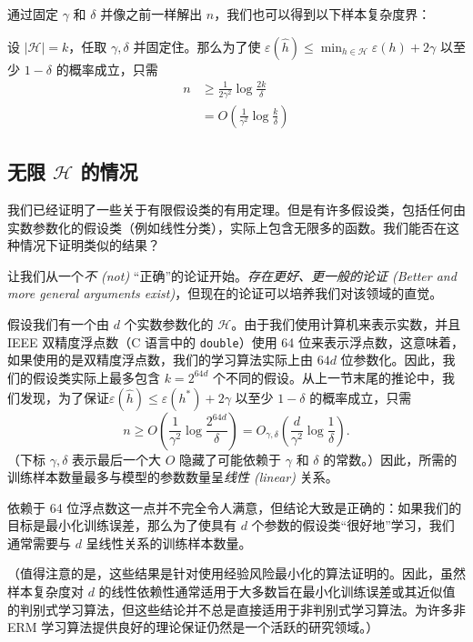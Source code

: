 通过固定 $\gamma$ 和 $\delta$ 并像之前一样解出 $n$，我们也可以得到以下样本复杂度界：

\begin{corollary*}
    设 $|\mathcal{H}| = k$，任取 $\gamma, \delta$ 并固定住。那么为了使 $\varepsilon(\hat{h}) \leq \min_{h \in \mathcal{H}} \varepsilon(h) + 2\gamma$ 以至少 $1 - \delta$ 的概率成立，只需
    \begin{align*}
        n 
        &\geq \frac{1}{2\gamma^2} \log \frac{2k}{\delta}\\
        & = O\left(\frac{1}{\gamma^2} \log \frac{k}{\delta}\right)
    \end{align*}
\end{corollary*}

\subsection{无限 \texorpdfstring{$\mathcal{H}$}{H} 的情况}


我们已经证明了一些关于有限假设类的有用定理。但是有许多假设类，包括任何由实数参数化的假设类（例如线性分类），实际上包含无限多的函数。我们能否在这种情况下证明类似的结果？

让我们从一个\textit{不 (not)} “正确”的论证开始。\textit{存在更好、更一般的论证 (Better and more general arguments exist)}，但现在的论证可以培养我们对该领域的直觉。

假设我们有一个由 $d$ 个实数参数化的 $\mathcal{H}$。由于我们使用计算机来表示实数，并且 IEEE 双精度浮点数（C 语言中的 \texttt{double}）使用 64 位来表示浮点数，这意味着，如果使用的是双精度浮点数，我们的学习算法实际上由 $64d$ 位参数化。因此，我们的假设类实际上最多包含 $k = 2^{64d}$ 个不同的假设。从上一节末尾的推论中，我们发现，为了保证$\varepsilon(\hat{h}) \leq \varepsilon(h^*) + 2\gamma$ 以至少 $1 - \delta$ 的概率成立，只需
\[
    n \geq O\left(\frac{1}{\gamma^2} \log \frac{2^{64d}}{\delta}\right) = O_{\gamma, \delta}\left(\frac{d}{\gamma^2} \log \frac{1}{\delta}\right).
\]
（下标 $\gamma, \delta$ 表示最后一个大 $O$ 隐藏了可能依赖于 $\gamma$ 和 $\delta$ 的常数。）因此，所需的训练样本数量最多与模型的参数数量呈\textit{线性 (linear)} 关系。

依赖于 64 位浮点数这一点并不完全令人满意，但结论大致是正确的：如果我们的目标是最小化训练误差，那么为了使具有 $d$ 个参数的假设类“很好地”学习，我们通常需要与 $d$ 呈线性关系的训练样本数量。

（值得注意的是，这些结果是针对使用经验风险最小化的算法证明的。因此，虽然样本复杂度对 $d$ 的线性依赖性通常适用于大多数旨在最小化训练误差或其近似值的判别式学习算法，但这些结论并不总是直接适用于非判别式学习算法。为许多非 ERM 学习算法提供良好的理论保证仍然是一个活跃的研究领域。）

